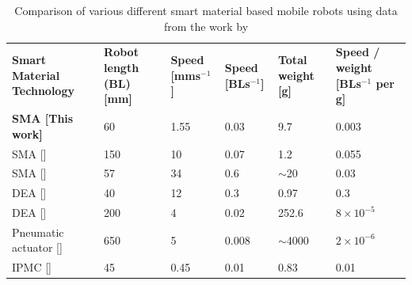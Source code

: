 \begin{table}[hbt!]
 \centering
 \hfill
 \caption{Comparison of various different smart material based mobile robots using data from the work by \cite{jiAutonomousUntetheredFast2019}}
 \label{tab:literature-compare}
 {
\begin{tabular}{p{3.5cm}P{2cm}P{1.5cm}P{1.5cm}P{1.25cm}P{2.25cm}}
    \textbf{\color{white} Smart Material Technology} & \textbf{\color{white} Robot length (BL) [mm]} & \textbf{\color{white} Speed [mms$^{-1}$]} & \textbf{\color{white} Speed [BLs$^{-1}$]} & \textbf{\color{white} Total weight [g]}  & \textbf{\color{white} Speed / weight [BLs$^{-1}$ per g]} \\
   \textbf{SMA [This work]}          & 60                         & 1.55              & 0.03              & 9.7                  & 0.003                          \\
   SMA [\cite{kohOmegaShapedInchwormInspiredCrawling2013}] & 150 & 10 & 0.07 & 1.2 & 0.055\\
   SMA [\cite{huangChasingBiomimeticLocomotion2018}]                          & 57                         & 34                & 0.6               & $\sim$20             & 0.03                           \\
   DEA [\cite{jiAutonomousUntetheredFast2019}]                         & 40                         & 12                & 0.3               & 0.97                 & 0.3                            \\
   DEA [\cite{caoUntetheredSoftRobot2018}]                          & 200                        & 4                 & 0.02              & 252.6                & $8\times10^{-5}$                         \\
   Pneumatic actuator [\cite{tolleyResilientUntetheredSoft2014}] & 650                        & 5                 & 0.008             & $\sim$4000           & $2\times10^{-6}$                         \\
   IPMC [\cite{mustIonicCapacitiveArtificial2015}]                         & 45                         & 0.45              & 0.01              & 0.83                 & 0.01                           \\
\end{tabular}}
\end{table}
